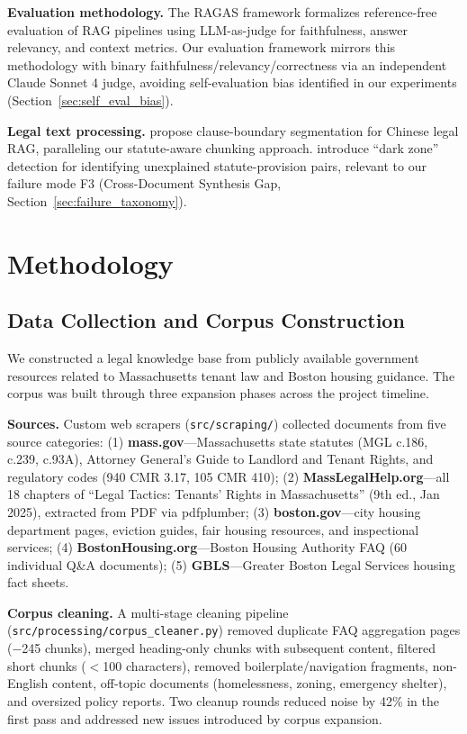 \documentclass{article}
\begin{document}
\textbf{Evaluation methodology.} The RAGAS framework \citep{es2024ragas} formalizes reference-free evaluation of RAG pipelines using LLM-as-judge for faithfulness, answer relevancy, and context metrics. Our evaluation framework mirrors this methodology with binary faithfulness/relevancy/correctness via an independent Claude Sonnet 4 judge, avoiding self-evaluation bias identified in our experiments (Section~\ref{sec:self_eval_bias}).

\textbf{Legal text processing.} \citet{legaldc2025} propose clause-boundary segmentation for Chinese legal RAG, paralleling our statute-aware chunking approach. \citet{symmetry2025legal} introduce ``dark zone'' detection for identifying unexplained statute-provision pairs, relevant to our failure mode F3 (Cross-Document Synthesis Gap, Section~\ref{sec:failure_taxonomy}).

\section{Methodology}
\label{sec:methodology}

\subsection{Data Collection and Corpus Construction}
\label{sec:corpus}

We constructed a legal knowledge base from publicly available government resources related to Massachusetts tenant law and Boston housing guidance. The corpus was built through three expansion phases across the project timeline.

\textbf{Sources.} Custom web scrapers (\texttt{src/scraping/}) collected documents from five source categories: (1) \textbf{mass.gov}---Massachusetts state statutes (MGL c.186, c.239, c.93A), Attorney General's Guide to Landlord and Tenant Rights, and regulatory codes (940 CMR 3.17, 105 CMR 410); (2) \textbf{MassLegalHelp.org}---all 18 chapters of ``Legal Tactics: Tenants' Rights in Massachusetts'' (9th ed., Jan 2025), extracted from PDF via pdfplumber; (3) \textbf{boston.gov}---city housing department pages, eviction guides, fair housing resources, and inspectional services; (4) \textbf{BostonHousing.org}---Boston Housing Authority FAQ (60 individual Q\&A documents); (5) \textbf{GBLS}---Greater Boston Legal Services housing fact sheets.

\textbf{Corpus cleaning.} A multi-stage cleaning pipeline (\texttt{src/processing/corpus\_cleaner.py}) removed duplicate FAQ aggregation pages ($-$245 chunks), merged heading-only chunks with subsequent content, filtered short chunks ($<$100 characters), removed boilerplate/navigation fragments, non-English content, off-topic documents (homelessness, zoning, emergency shelter), and oversized policy reports. Two cleanup rounds reduced noise by 42\% in the first pass and addressed new issues introduced by corpus expansion.
\end{document}

